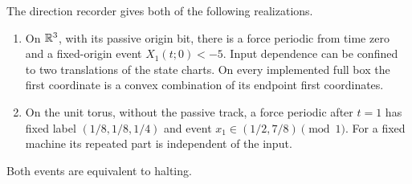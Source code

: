 \begin{proposition}
\label{thm:bb-aligned38}\label{thm:bb-direction39}
The direction recorder gives both of the following realizations.
\begin{enumerate}
\item On $\mathbb R^3$, with its passive origin bit, there is a force periodic
from time zero and a fixed-origin event $X_1(t;0)<-5$.  Input dependence
can be confined to two translations of the state charts.  On every
implemented full box the first coordinate is a convex combination
of its endpoint first coordinates.
\item On the unit torus, without the passive track, a force periodic
after $t=1$ has fixed label $(1/8,1/8,1/4)$ and event
$x_1\in(1/2,7/8)\pmod1$.  For a fixed machine its repeated part is
independent of the input.
\end{enumerate}
Both events are equivalent to halting.
\end{proposition}
